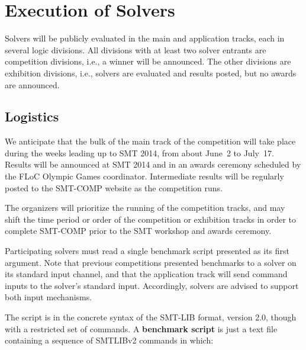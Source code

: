 \documentclass[12pt]{article}
\begin{document}
\section{Execution of Solvers}
\label{sec:exec}

Solvers will be publicly evaluated in the main and application tracks, each in several logic divisions. 
All divisions with at least two solver entrants are competition divisions, i.e., a winner will be announced. The other divisions are exhibition divisions, i.e., solvers are evaluated and results posted, but no awards are announced.

\subsection{Logistics}

%
We anticipate that the bulk of the main track of the competition will take place during
the weeks leading up to SMT 2014, from about June~2 to July~17.  Results will be
announced at SMT 2014 and in an awards ceremony scheduled by the FLoC Olympic Games coordinator.
  Intermediate results
will be regularly posted to the SMT-COMP website as the competition
runs.


The organizers will prioritize the running of the competition tracks, and may shift the
time period or order of the competition or exhibition tracks in order to complete SMT-COMP
prior to the SMT workshop and awards ceremony.

%
Participating solvers must read a single benchmark script presented as its first argument.
Note that previous competitions presented benchmarks to a solver on its standard input
channel, and that the application track will send command inputs to the solver's standard input.
Accordingly, solvers are advised to support both input mechanisms.

 The script is in the concrete syntax of the SMT-LIB format,
version 2.0, though with a restricted set of commands.   A
\textbf{benchmark script} is just a text file containing a sequence of SMTLIBv2 commands in which:
\end{document}
